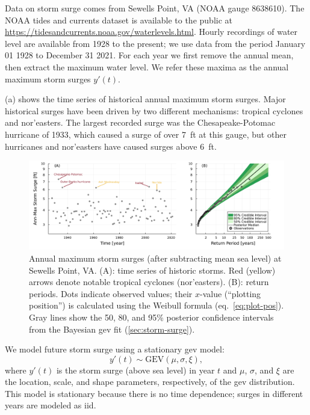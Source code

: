 \documentclass[12pt]{article}
\begin{document}
Data on storm surge comes from Sewells Point, VA (NOAA gauge 8638610).
The NOAA tides and currents dataset is available to the public at \url{https://tidesandcurrents.noaa.gov/waterlevels.html}.
Hourly recordings of water level are available from 1928 to the present; we use data from the period January 01 1928 to December 31 2021.
For each year we first remove the annual mean, then extract the  maximum water level.
We refer these maxima as the annual maximum storm surges $y'(t)$.

(a) shows the time series of historical annual maximum storm surges.
Major historical surges have been driven by two different mechanisms: tropical cyclones and nor'easters.
The largest recorded surge was the Chesapeake-Potomac hurricane of 1933, which caused a surge of over \SI{7}{ft} at this gauge, but other hurricanes and nor'easters have caused surges above \SI{6}{ft}.

\begin{figure}
    \centering
    \includegraphics[width=\textwidth]{surge-obs-return}
    \caption{
        Annual maximum storm surges (after subtracting mean sea level) at Sewells Point, VA.
        (A):
        time series of historic storms.
        Red (yellow) arrows denote notable tropical cyclones (nor'easters).
        (B):
        return periods.
        Dots indicate observed values; their $x$-value (``plotting position'') is calculated using the Weibull formula (eq.~\ref{eq:plot-pos}).
        Gray lines show the 50, 80, and 95\% posterior confidence intervals from the Bayesian \gls{gev} fit (\cref{sec:storm-surge}).
    }\label{fig:surge-obs-return}
\end{figure}

We model future storm surge using a stationary \gls{gev} model:
\begin{equation}\label{eq:surge-model}
    y'(t) \sim \text{GEV}\left(\mu, \sigma, \xi \right),
\end{equation}
where $y'(t)$ is the storm surge (above sea level) in year $t$ and $\mu$, $\sigma$, and $\xi$ are the location, scale, and shape parameters, respectively, of the \gls{gev} distribution.
This model is stationary because there is no time dependence; surges in different years are modeled as \gls{iid}.
\end{document}
